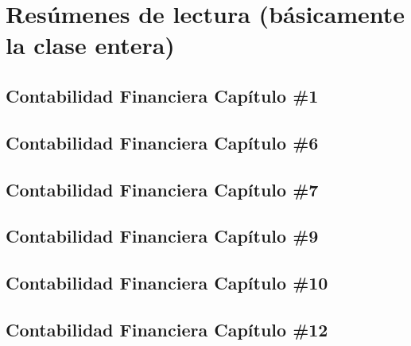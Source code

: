 \documentclass{book}
\begin{document}
\part{Resúmenes de lectura (básicamente la clase entera)}
\chapter{Contabilidad Financiera Capítulo \#1}
% 


\chapter{Contabilidad Financiera Capítulo \#6}
% 

\chapter{Contabilidad Financiera Capítulo \#7}
% 

\chapter{Contabilidad Financiera Capítulo \#9}
% 


\chapter{Contabilidad Financiera Capítulo \#10}
% 

\chapter{Contabilidad Financiera Capítulo \#12}
 

\end{document}
